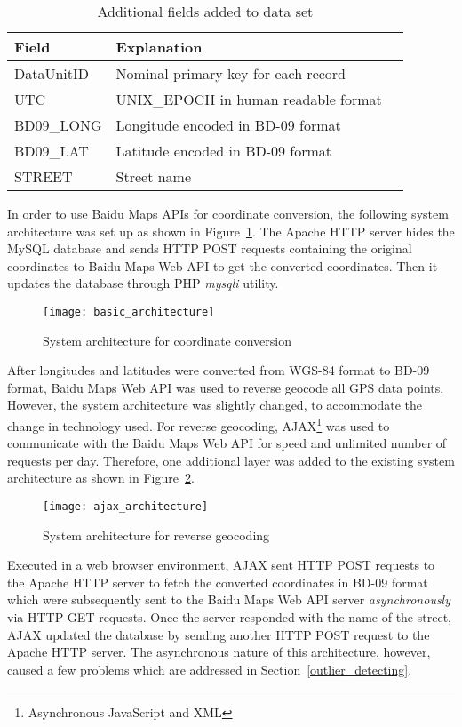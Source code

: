 \begin{table}[h!]
\centering
\begin{tabular}{ | l | l | l | }
\hline
\textbf{Field} & \textbf{Explanation} \\ \hline
DataUnitID & Nominal primary key for each record \\ \hline
UTC & UNIX\_EPOCH in human readable format \\ \hline
BD09\_LONG & Longitude encoded in BD-09 format\\ \hline
BD09\_LAT & Latitude encoded in BD-09 format\\ \hline
STREET & Street name\\ \hline
\end{tabular}
\caption{Additional fields added to data set}\label{Ta:addtional_field}
\end{table}

In order to use Baidu Maps APIs for coordinate conversion, the following system architecture was set up as shown in Figure~\ref{Fig:basic_architecture}. The Apache HTTP server hides the MySQL database and sends HTTP POST requests containing the original coordinates to Baidu Maps Web API to get the converted coordinates. Then it updates the database through PHP \emph{mysqli} utility. 

\begin{figure}[h!]
\texttt{[image: basic\_architecture]}
\centering
\caption{System architecture for coordinate conversion}\label{Fig:basic_architecture}
\end{figure}

After longitudes and latitudes were converted from WGS-84 format to BD-09 format, Baidu Maps Web API was used to reverse geocode all GPS data points. However, the system architecture was slightly changed, to accommodate the change in technology used. For reverse geocoding, AJAX\footnote{Asynchronous JavaScript and XML} was used to communicate with the Baidu Maps Web API for speed and unlimited number of requests per day. Therefore, one additional layer was added to the existing system architecture as shown in Figure~\ref{Fig:ajax_architecture}. 

\begin{figure}[h]
\texttt{[image: ajax\_architecture]}
\centering
\caption{System architecture for reverse geocoding}\label{Fig:ajax_architecture}
\end{figure}

Executed in a web browser environment, AJAX sent HTTP POST requests to the Apache HTTP server to fetch the converted coordinates in BD-09 format which were subsequently sent to the Baidu Maps Web API server \emph{asynchronously} via HTTP GET requests. Once the server responded with the name of the street, AJAX updated the database by sending another HTTP POST request to the Apache HTTP server. The asynchronous nature of this architecture, however, caused a few problems which are addressed in Section~\ref{outlier_detecting}. 

